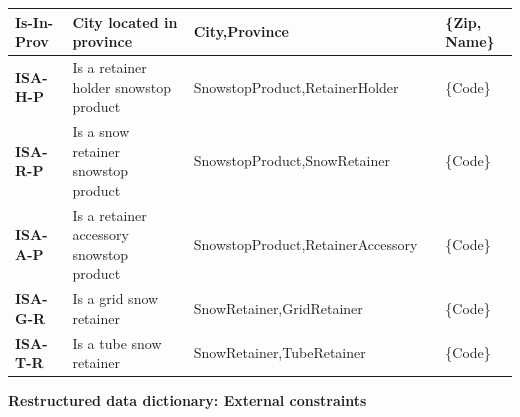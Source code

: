 \documentclass{article}[h]
\begin{document}
\begin{table}[H]
\begin{tabular}{ | m{3cm} | m{2.5cm}| m{3.5cm} | m{2.5cm} | m{2cm} |}
    \hline
    \color[HTML]{3531FF} \textbf{Is-In-Prov} & City located in province & City,\newline Province &  & \{Zip, Name\} \\ 
    \hline
    \color[HTML]{3531FF} \textbf{ISA-H-P} & Is a retainer holder snowstop product & SnowstopProduct,\newline RetainerHolder &  & \{Code\} \\ 
    \hline
    \color[HTML]{3531FF} \textbf{ISA-R-P} & Is a snow retainer snowstop product & SnowstopProduct,\newline SnowRetainer &  & \{Code\} \\ 
    \hline
    \color[HTML]{3531FF} \textbf{ISA-A-P} & Is a retainer accessory snowstop product & SnowstopProduct,\newline RetainerAccessory &  & \{Code\} \\ 
    \hline
    \color[HTML]{3531FF} \textbf{ISA-G-R} & Is a grid snow retainer & SnowRetainer,\newline GridRetainer &  & \{Code\} \\ 
    \hline
    \color[HTML]{3531FF} \textbf{ISA-T-R} & Is a tube snow retainer & SnowRetainer,\newline TubeRetainer &  & \{Code\} \\ 
    \hline
  \end{tabular}
\end{table}

\pagebreak

{\centering \textbf{Restructured data dictionary: External constraints}\\}
\end{document}
